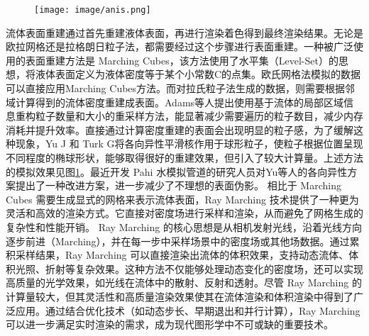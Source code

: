\begin{figure}[ht]
 \centering
 \texttt{[image: image/anis.png]}
 \label{fig:anis}
\end{figure}

\newline
\indent 流体表面重建通过首先重建液体表面，再进行渲染着色得到最终渲染结果。无论是欧拉网格还是拉格朗日粒子法，都需要经过这个步骤进行表面重建。一种被广泛使用的表面重建方法是 Marching Cubes\cite{lorensen1998marching}，该方法使用了水平集（Level-Set）\cite{sethian2003level}的思想，将液体表面定义为液体密度等于某个小常数C的点集。欧氏网格法模拟的数据可以直接应用Marching Cubes方法。而对拉氏粒子法生成的数据，则需要根据邻域计算得到的流体密度重建成表面。Adams等人\cite{adams2007adaptively}提出使用基于流体的局部区域信息重构粒子数量和大小的重采样方法，能显著减少需要遍历的粒子数目，减少内存消耗并提升效率。直接通过计算密度重建的表面会出现明显的粒子感，为了缓解这种现象，Yu J 和 Turk G\cite{yu2013reconstructing}将各向异性平滑核作用于球形粒子，使粒子根据位置呈现不同程度的椭球形状，能够取得很好的重建效果，但引入了较大计算量。上述方法的模拟效果见图\ref{fig:anis}。最近开发 Pahi 水模拟管道的研究人员\cite{stomakhin2023pahi}对Yu等人的各向异性方案提出了一种改进方案，进一步减少了不理想的表面伪影。
相比于 Marching Cubes 需要生成显式的网格来表示流体表面，Ray Marching 技术\cite{hart1996sphere, wald2005interactive}提供了一种更为灵活和高效的渲染方式。它直接对密度场进行采样和渲染，从而避免了网格生成的复杂性和性能开销。
\newline
\indent Ray Marching 的核心思想是从相机发射光线，沿着光线方向逐步前进（Marching），并在每一步中采样场景中的密度场或其他场数据。通过累积采样结果，Ray Marching 可以直接渲染出流体的体积效果，支持动态流体、体积光照、折射等复杂效果。这种方法不仅能够处理动态变化的密度场，还可以实现高质量的光学效果，如光线在流体中的散射、反射和透射。尽管 Ray Marching 的计算量较大，但其灵活性和高质量渲染效果使其在流体渲染和体积渲染中得到了广泛应用。通过结合优化技术（如动态步长、早期退出和并行计算），Ray Marching 可以进一步满足实时渲染的需求，成为现代图形学中不可或缺的重要技术。 

\newline

